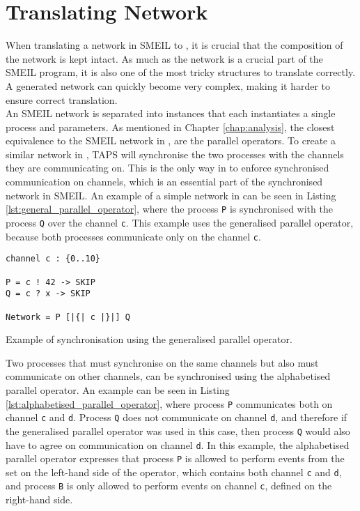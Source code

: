\section{Translating Network}
\label{sec:design_translating_network}
When translating a network in SMEIL to \cspm{}, it is crucial that the composition of the network is kept intact. As much as the network is a crucial part of the SMEIL program, it is also one of the most tricky structures to translate correctly. A generated network can quickly become very complex, making it harder to ensure correct translation. \\

An SMEIL network is separated into instances that each instantiates a single process and parameters. As mentioned in Chapter \ref{chap:analysis}, the closest equivalence to the SMEIL network in \cspm{}, are the parallel operators. To create a similar network in \cspm{}, TAPS will synchronise the two processes with the channels they are communicating on.
This is the only way in \cspm{} to enforce synchronised communication on channels, which is an essential part of the synchronised network in SMEIL. An example of a simple network in \cspm{} can be seen in Listing \ref{lst:general_parallel_operator}, where the process \texttt{P} is synchronised with the process \texttt{Q} over the channel \texttt{c}.
This example uses the generalised parallel operator, because both processes communicate only on the channel \texttt{c}.\\

\begin{listing}
\begin{verbatim}
channel c : {0..10}

P = c ! 42 -> SKIP
Q = c ? x -> SKIP

Network = P [|{| c |}|] Q
\end{verbatim}
\caption{Example of synchronisation using the generalised parallel operator.}
\label{lst:general_parallel_operator}
\end{listing}
Two processes that must synchronise on the same channels but also must communicate on other channels, can be synchronised using the alphabetised parallel operator. An example can be seen in Listing \ref{lst:alphabetised_parallel_operator}, where process \texttt{P} communicates both on channel \texttt{c} and \texttt{d}. Process \texttt{Q} does not communicate on channel \texttt{d}, and therefore if the generalised parallel operator was used in this case, then process \texttt{Q} would also have to agree on communication on channel \texttt{d}. In this example, the alphabetised parallel operator expresses that process \texttt{P} is allowed to perform events from the set on the left-hand side of the operator, which contains both channel \texttt{c} and \texttt{d}, and process \texttt{B} is only allowed to perform events on channel \texttt{c}, defined on the right-hand side.\\

